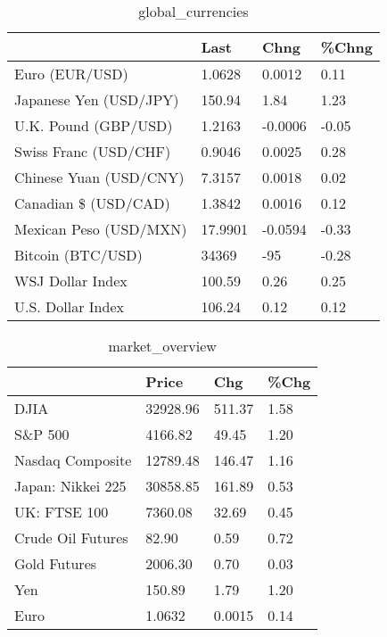 \documentclass{article}%
\begin{document}
%


\begin{table}[htbp]%
\caption{global\_currencies}%
\centering%
\begin{adjustbox}{width=1\textwidth}%
\begin{tabular}{llll}
\toprule
                       &    Last &    Chng & \%Chng \\
\midrule
        Euro (EUR/USD) &  1.0628 &  0.0012 &  0.11 \\
Japanese Yen (USD/JPY) &  150.94 &    1.84 &  1.23 \\
  U.K. Pound (GBP/USD) &  1.2163 & -0.0006 & -0.05 \\
 Swiss Franc (USD/CHF) &  0.9046 &  0.0025 &  0.28 \\
Chinese Yuan (USD/CNY) &  7.3157 &  0.0018 &  0.02 \\
  Canadian \$ (USD/CAD) &  1.3842 &  0.0016 &  0.12 \\
Mexican Peso (USD/MXN) & 17.9901 & -0.0594 & -0.33 \\
     Bitcoin (BTC/USD) &   34369 &     -95 & -0.28 \\
      WSJ Dollar Index &  100.59 &    0.26 &  0.25 \\
     U.S. Dollar Index &  106.24 &    0.12 &  0.12 \\
\bottomrule
\end{tabular}
%
\end{adjustbox}%
\end{table}

%


\begin{table}[htbp]%
\caption{market\_overview}%
\centering%
\begin{adjustbox}{width=1\textwidth}%
\begin{tabular}{llll}
\toprule
                  &    Price &    Chg & \%Chg \\
\midrule
             DJIA & 32928.96 & 511.37 & 1.58 \\
          S\&P 500 &  4166.82 &  49.45 & 1.20 \\
 Nasdaq Composite & 12789.48 & 146.47 & 1.16 \\
Japan: Nikkei 225 & 30858.85 & 161.89 & 0.53 \\
     UK: FTSE 100 &  7360.08 &  32.69 & 0.45 \\
Crude Oil Futures &    82.90 &   0.59 & 0.72 \\
     Gold Futures &  2006.30 &   0.70 & 0.03 \\
              Yen &   150.89 &   1.79 & 1.20 \\
             Euro &   1.0632 & 0.0015 & 0.14 \\
\bottomrule
\end{tabular}
%
\end{adjustbox}%
\end{table}

%
\end{document}
